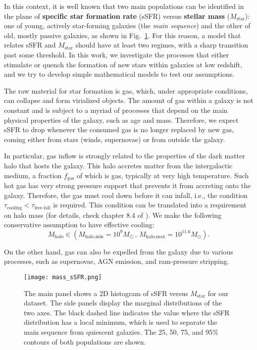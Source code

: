 \documentclass[fleqn,usenatbib]{mnras}
\begin{document}
In this context, it is well known \citep[e.g.,][]{Kauffmann_2003} that two main populations can be identified in the plane of \textbf{specific star formation rate} (sSFR) versus \textbf{stellar mass} ($M_{\text{star}}$): one of young, actively star-forming galaxies (the \textit{main sequence}) and the other of old, mostly passive galaxies, as shown in Fig.~\ref{fig:mass_sSFR}. For this reason, a model that relates sSFR and $M_{\text{star}}$ should have at least two regimes, with a sharp transition past some threshold. In this work, we investigate the processes that either stimulate or quench the formation of new stars within galaxies at low redshift, and we try to develop simple mathematical models to test our assumptions.

The raw material for star formation is gas, which, under appropriate conditions, can collapse and form virialized objects. The amount of gas within a galaxy is not constant and is subject to a myriad of processes that depend on the main physical properties of the galaxy, such as age and mass. Therefore, we expect sSFR to drop whenever the consumed gas is no longer replaced by new gas, coming either from stars (winds, supernovae) or from outside the galaxy. 

In particular, gas inflow is strongly related to the properties of the dark matter halo that hosts the galaxy. This halo accretes matter from the intergalactic medium, a fraction $f_{\text{gas}}$ of which is gas, typically at very high temperature. Such hot gas has very strong pressure support that prevents it from accreting onto the galaxy. Therefore, the gas must cool down before it can infall, i.e., the condition $\tau_{\text{cooling}} < \tau_{\text{free-fall}}$ is required. This condition can be translated into a requirement on halo mass (for details, check chapter 8.4 of \citet{galaxy_formation_and_evolution_2010}). We make the following conservative assumption to have effective cooling:
\begin{equation}
    M_{\text{halo}} \in \left( M_{\text{halo,min}}=10^9 M_\odot \, , \, M_{\text{halo,max}}=10^{11.6} M_\odot \right).
	\label{eq:halo_mass_minmax}
\end{equation}

On the other hand, gas can also be expelled from the galaxy due to various processes, such as supernovae, AGN emission, and ram-pressure stripping. 


\begin{figure}
	\texttt{[image: mass\_sSFR.png]}
    \caption{The main panel shows a 2D histogram of sSFR versus $M_{\text{star}}$ for our dataset. The side panels display the marginal distributions of the two axes. The black dashed line indicates the value where the sSFR distribution has a local minimum, which is used to separate the main sequence from quiescent galaxies. The 25, 50, 75, and 95\% contours of both populations are shown.}
    \label{fig:mass_sSFR}
\end{figure}
\end{document}
